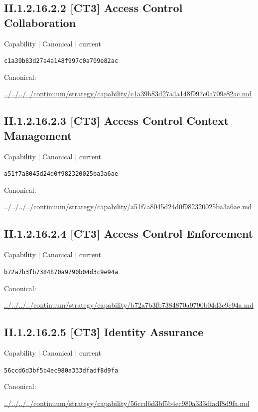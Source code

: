 \documentclass[10pt,a4paper]{article}
\begin{document}
\subsection*{II.1.2.16.2.2 [CT3] Access Control Collaboration}
\label{element-c1a39b83d27a4a148f997c0a709e82ac}
{\small Capability | Canonical | current}\par
\texttt{c1a39b83d27a4a148f997c0a709e82ac}\par
Canonical: \par
{\footnotesize\url{../../../../continuum/strategy/capability/c1a39b83d27a4a148f997c0a709e82ac.md}}\par
\subsection*{II.1.2.16.2.3 [CT3] Access Control Context Management}
\label{element-a51f7a8045d24d0f982320025ba3a6ae}
{\small Capability | Canonical | current}\par
\texttt{a51f7a8045d24d0f982320025ba3a6ae}\par
Canonical: \par
{\footnotesize\url{../../../../continuum/strategy/capability/a51f7a8045d24d0f982320025ba3a6ae.md}}\par
\subsection*{II.1.2.16.2.4 [CT3] Access Control Enforcement}
\label{element-b72a7b3fb7384870a9790b04d3c9e94a}
{\small Capability | Canonical | current}\par
\texttt{b72a7b3fb7384870a9790b04d3c9e94a}\par
Canonical: \par
{\footnotesize\url{../../../../continuum/strategy/capability/b72a7b3fb7384870a9790b04d3c9e94a.md}}\par
\subsection*{II.1.2.16.2.5 [CT3] Identity Assurance}
\label{element-56ccd6d3bf5b4ec980a333dfadf8d9fa}
{\small Capability | Canonical | current}\par
\texttt{56ccd6d3bf5b4ec980a333dfadf8d9fa}\par
Canonical: \par
{\footnotesize\url{../../../../continuum/strategy/capability/56ccd6d3bf5b4ec980a333dfadf8d9fa.md}}\par
\end{document}
